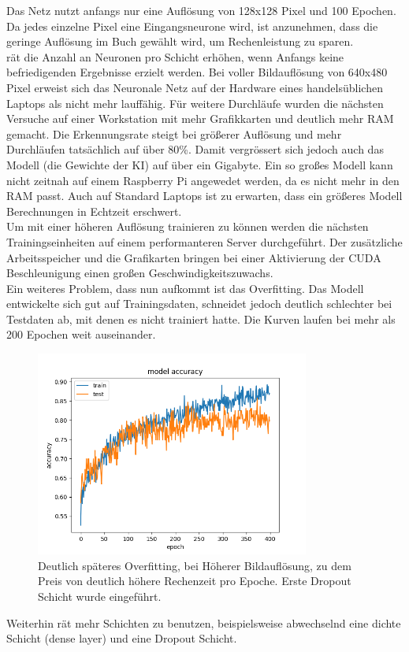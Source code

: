 \documentclass[conference]{IEEEtran}
\begin{document}
	Das Netz nutzt anfangs nur eine Auflösung von 128x128 Pixel und 100 
	Epochen. Da jedes einzelne Pixel eine Eingangsneurone wird, ist 
	anzunehmen, dass die geringe Auflösung im Buch 
	\cite{govers2018artificial} gewählt wird, um Rechenleistung zu 
	sparen. \\
	

	
	\cite{moolayil2019learn} rät die Anzahl an Neuronen pro Schicht erhöhen, wenn Anfangs keine befriedigenden Ergebnisse erzielt werden.
	Bei voller Bildauflösung von 640x480 Pixel erweist sich das Neuronale 
	Netz auf der Hardware eines handelsüblichen Laptops als nicht mehr 
	lauffähig. Für weitere Durchläufe wurden die nächsten Versuche auf einer 
	Workstation mit mehr Grafikkarten und deutlich mehr RAM gemacht. 
	Die Erkennungsrate steigt bei größerer Auflösung und mehr Durchläufen 
	tatsächlich auf über 80\%. Damit vergrössert sich jedoch auch das Modell (die 
	Gewichte der KI) auf über ein Gigabyte. Ein so großes Modell kann nicht 
	zeitnah auf einem Raspberry Pi angewedet werden, da es nicht mehr in 
	den RAM passt. Auch auf Standard Laptops ist zu erwarten, dass ein 
	größeres Modell Berechnungen in Echtzeit erschwert. \\
	
	Um mit einer höheren Auflösung trainieren zu können werden die 
	nächsten Trainingseinheiten auf einem performanteren Server 
	durchgeführt. Der zusätzliche Arbeitsspeicher und die Grafikarten 
	bringen bei einer Aktivierung der CUDA Beschleunigung einen großen 
	Geschwindigkeitszuwachs. \\
	
	Ein weiteres Problem, dass nun aufkommt ist das Overfitting. Das Modell entwickelte sich gut auf Trainingsdaten, schneidet jedoch deutlich schlechter bei Testdaten ab, mit denen es nicht trainiert hatte. Die Kurven laufen bei mehr als 200 Epochen weit auseinander.\\
	
	\begin{figure}[!h]
	\centering
	\includegraphics[width=9cm]{img/213x160:400@32_accuracy.png}
	\caption{Deutlich späteres Overfitting, bei Höherer Bildauflösung, zu dem 
	Preis von deutlich höhere Rechenzeit pro Epoche. Erste Dropout Schicht 
	wurde eingeführt. }
	\label{Overfitt }
\end{figure}
	Weiterhin rät \cite{moolayil2019learn} mehr Schichten zu benutzen, 
	beispielsweise abwechselnd eine dichte Schicht (dense layer) und eine 
	Dropout Schicht.
	
\end{document}
